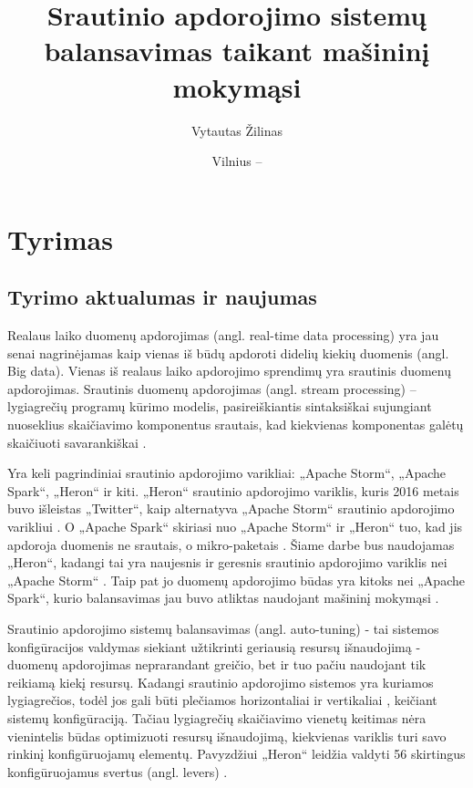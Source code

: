 \documentclass{VUMIFPSbakalaurinis}
\title{Srautinio apdorojimo sistemų balansavimas taikant mašininį mokymąsi}
\author{Vytautas Žilinas}
\date{Vilnius – \the\year}
\begin{document}
 
\maketitle

\cleardoublepage{}
\setcounter{page}{2}

\section{Tyrimas}
\subsection{Tyrimo aktualumas ir naujumas}

Realaus laiko duomenų apdorojimas (angl. real-time data processing) yra jau senai nagrinėjamas kaip vienas iš būdų apdoroti didelių kiekių duomenis (angl. Big data). Vienas iš realaus laiko apdorojimo sprendimų yra srautinis duomenų apdorojimas. Srautinis duomenų apdorojimas (angl. stream processing) – lygiagrečių programų kūrimo modelis, pasireiškiantis sintaksiškai sujungiant nuoseklius skaičiavimo komponentus srautais, kad kiekvienas komponentas galėtų skaičiuoti savarankiškai \cite{shortstreamproc}. 

Yra keli pagrindiniai srautinio apdorojimo varikliai: „Apache Storm“, „Apache Spark“, „Heron“ ir kiti. „Heron“ srautinio apdorojimo variklis, kuris 2016 metais buvo išleistas „Twitter“, kaip alternatyva „Apache Storm“ srautinio apdorojimo varikliui \cite{openSourcing}. O „Apache Spark“ skiriasi nuo „Apache Storm“ ir „Heron“ tuo, kad jis apdoroja duomenis ne srautais, o mikro-paketais \cite{karau2015learning}. Šiame darbe bus naudojamas „Heron“, kadangi tai yra naujesnis ir geresnis srautinio apdorojimo variklis nei „Apache Storm“ \cite{twitterHeron}. Taip pat jo duomenų apdorojimo būdas yra kitoks nei „Apache Spark“, kurio balansavimas jau buvo atliktas naudojant mašininį mokymąsi \cite{vaquero2018autotuning}.

Srautinio apdorojimo sistemų balansavimas (angl. auto-tuning) - tai sistemos konfigūracijos valdymas siekiant užtikrinti geriausią resursų išnaudojimą - duomenų apdorojimas neprarandant greičio, bet ir tuo pačiu naudojant tik reikiamą kiekį resursų. Kadangi srautinio apdorojimo sistemos yra kuriamos lygiagrečios, todėl jos gali būti plečiamos horizontaliai ir vertikaliai \cite{shortstreamproc}, keičiant sistemų konfigūraciją. Tačiau lygiagrečių skaičiavimo vienetų keitimas nėra vienintelis būdas optimizuoti resursų išnaudojimą, kiekvienas variklis turi savo rinkinį konfigūruojamų elementų. Pavyzdžiui „Heron“ leidžia valdyti 56 skirtingus konfigūruojamus svertus (angl. levers) \cite{configDocument}.
\end{document}
